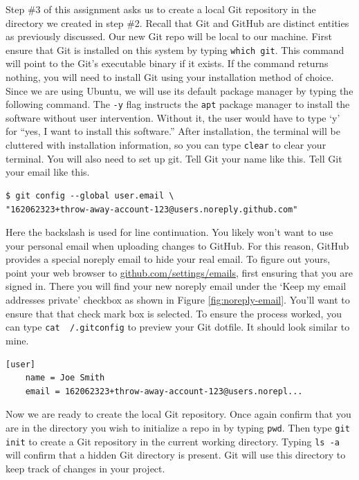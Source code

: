 \documentclass{article}
\begin{document}
Step \#3 of this assignment asks us to create a local Git repository in the
directory we created in step \#2. Recall that Git and GitHub are distinct
entities as previously discussed. Our new Git repo will be local to our machine.
First ensure that Git is installed on this system by typing
\texttt{which git}. This command will point to the Git's executable
binary if it exists. If the command returns nothing, you will need to install
Git using your installation method of choice. Since we are using Ubuntu, we will
use its default package manager by typing the following command.
%
%
The \verb|-y| flag instructs the \verb|apt| package manager to install the
software without user intervention. Without it, the user would have to type `y'
for ``yes, I want to install this software.'' After installation, the terminal
will be cluttered with installation information, so you can type
\texttt{clear} to clear your terminal.
%
You will also need to set up git. Tell Git your name like this.
%
%
Tell Git your email like this.
%
\begin{verbatim}
$ git config --global user.email \
"162062323+throw-away-account-123@users.noreply.github.com"
\end{verbatim}
%
Here the backslash is used for line continuation.  You likely won't want to use
your personal email when uploading changes to GitHub.  For this reason, GitHub
provides a special noreply email to hide your real email. To figure out yours,
point your web browser to \url{github.com/settings/emails}, first ensuring that
you are signed in. There you will find your new noreply email under the `Keep my
email addresses private' checkbox as shown in Figure \ref{fig:noreply-email}.
You'll want to ensure that that check mark box is selected.  To ensure the
process worked, you can type \texttt{cat ~/.gitconfig} to preview your
Git dotfile. It should look similar to mine.
%
\begin{verbatim}
[user]
	name = Joe Smith
	email = 162062323+throw-away-account-123@users.norepl...
\end{verbatim}

Now we are ready to create the local Git repository.  Once again confirm that
you are in the directory you wish to initialize a repo in by typing
\texttt{pwd}. Then type \texttt{git init} to create a Git
repository in the current working directory. Typing \texttt{ls -a}
will confirm that a hidden Git directory is present.  Git will use this
directory to keep track of changes in your project.
\end{document}
